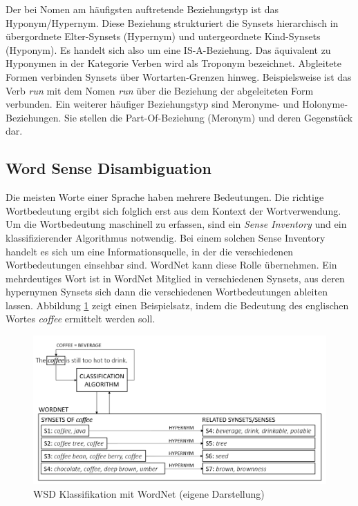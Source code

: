 Der bei Nomen am häufigsten auftretende Beziehungstyp ist das Hyponym/Hypernym. Diese Beziehung strukturiert die Synsets hierarchisch in übergordnete Elter-Synsets (Hypernym) und untergeordnete Kind-Synsets (Hyponym). Es handelt sich also um eine IS-A-Beziehung. Das äquivalent zu Hyponymen in der Kategorie Verben wird als Troponym bezeichnet. Abgleitete Formen verbinden Synsets über Wortarten-Grenzen hinweg. Beispielsweise ist das Verb \textit{run} mit dem Nomen \textit{run} über die Beziehung der abgeleiteten Form verbunden. Ein weiterer häufiger Beziehungstyp sind Meronyme- und Holonyme-Beziehungen. Sie stellen die Part-Of-Beziehung (Meronym) und deren Gegenstück dar.

\par
\subsection{Word Sense Disambiguation}

Die meisten Worte einer Sprache haben mehrere Bedeutungen. Die richtige Wortbedeutung ergibt sich folglich erst aus dem Kontext der Wortverwendung. Um die Wortbedeutung maschinell zu erfassen, sind ein \textit{Sense Inventory} und ein klassifizierender Algorithmus notwendig. Bei einem solchen Sense Inventory handelt es sich um eine Informationsquelle, in der die verschiedenen Wortbedeutungen einsehbar sind. WordNet kann diese Rolle übernehmen. Ein mehrdeutiges Wort ist in WordNet Mitglied in verschiedenen Synsets, aus deren hypernymen Synsets sich dann die verschiedenen Wortbedeutungen ableiten lassen. Abbildung \ref{fig:WSD} zeigt einen Beispielsatz, indem die Bedeutung des englischen Wortes \textit{coffee} ermittelt werden soll.
\par 


\begin{figure}[H]
\begin{center}
\includegraphics[keepaspectratio=true, width=\textwidth]{pictures/WSD.png}
\caption{WSD Klassifikation mit WordNet (eigene Darstellung)}
\label{fig:WSD}
\end{center}
\end{figure}

